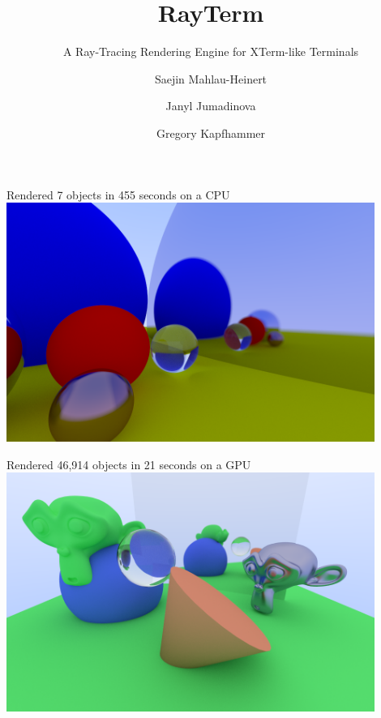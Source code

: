 \documentclass[alleghenyposter]{betterposter}
\begin{document}
{{\begin{minipage}[c]{0.5\textwidth}
\begin{center}
{ \fontsize{16}{22} \selectfont Rendered 7 objects in 455 seconds on a CPU }
\includegraphics[width=0.9\textwidth]{img/hq-cpu}
\end{center}
\end{minipage}%
\begin{minipage}[c]{0.5\textwidth}
\begin{center}
{ \fontsize{16}{22} \selectfont Rendered 46,914 objects in 21 seconds on a GPU }
\includegraphics[width=0.9\textwidth]{img/hq-gpu}
\end{center}
\end{minipage}%
}

}{

\title{RayTerm}
\subtitle{A Ray-Tracing Rendering Engine for XTerm-like Terminals}
\author{Saejin Mahlau-Heinert}
\author{Janyl Jumadinova}
\author{Gregory Kapfhammer}

}
\end{document}
